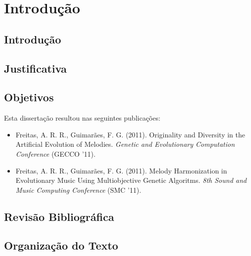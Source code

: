 \chapter{Introdução}
\label{chap:Intro}

\section{Introdução}


\section{Justificativa}



\section{Objetivos} 



Esta dissertação resultou nas seguintes publicações:

\begin{itemize}
\item Freitas, A. R. R., Guimarães, F. G. (2011). Originality and Diversity in the Artificial Evolution of Melodies. \textit{Genetic and Evolutionary Computation Conference} (GECCO '11).
\item Freitas, A. R. R., Guimarães, F. G. (2011). Melody Harmonization in Evolutionary Music Using Multiobjective Genetic Algoritms. \textit{8th Sound and Music Computing Conference} (SMC '11).
\end{itemize}


\section{Revisão Bibliográfica}



\section{Organização do Texto}
